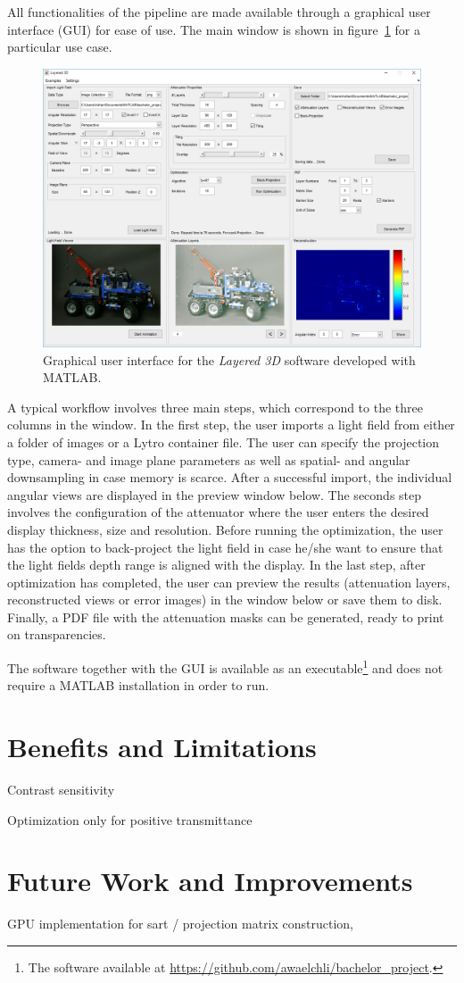 All functionalities of the pipeline are made available through a graphical user interface \mbox{(GUI)} for ease of use.
The main window is shown in figure~\ref{fig:gui_overview} for a particular use case.
\begin{figure}[tb]
	\includegraphics[width = \linewidth]{../Figures/gui/overview.png}
	\caption[Graphical user interface]
			{Graphical user interface for the \emph{Layered 3D} software developed with MATLAB.}
	\label{fig:gui_overview}
\end{figure}
A typical workflow involves three main steps, which correspond to the three columns in the window.
In the first step, the user imports a light field from either a folder of images or a \mbox{Lytro} container file.
The user can specify the projection type, camera- and image plane parameters as well as spatial- and angular downsampling in case memory is scarce.
After a successful import, the individual angular views are displayed in the preview window below.
The seconds step involves the configuration of the attenuator where the user enters the desired display thickness, size and resolution.
Before running the optimization, the user has the option to back-project the light field in case he/she want to ensure that the light fields depth range is aligned with the display.
In the last step, after optimization has completed, the user can preview the results (attenuation layers, reconstructed views or error images) in the window below or save them to disk.
Finally, a \mbox{PDF} file with the attenuation masks can be generated, ready to print on transparencies.

The software together with the GUI is available as an executable\footnote{The software available at \url{https://github.com/awaelchli/bachelor_project}.} 
and does not require a \mbox{MATLAB} installation in order to run.

\section{Benefits and Limitations}
\label{sec:benefits_limitations}

Contrast sensitivity

Optimization only for positive transmittance

\section{Future Work and Improvements}
\label{sec:future_work}

GPU implementation for sart / projection matrix construction, 
